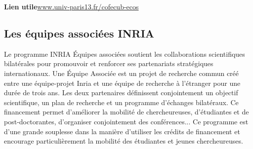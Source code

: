 \textbf{Lien utile\hspace{.5em}}\url{www.univ-paris13.fr/cofecub-ecos}


\subsection{Les \'equipes associ\'ees INRIA}
Le programme INRIA \og\'Equipes associ\'ees \fg{} soutient les collaborations scientifiques bilat\'erales pour promouvoir et renforcer ses partenariats strat\'egiques internationaux. Une \'Equipe Associ\'ee est un projet de recherche commun cr\'e\'e entre une \'equipe-projet Inria et une \'equipe de recherche à l'\'etranger pour une dur\'ee de trois ans. Les deux partenaires d\'efinissent conjointement un objectif scientifique, un plan de recherche et un programme d’\'echanges bilat\'eraux.
Ce financement permet d'am\'eliorer la mobilit\'e de chercheur\mp euse\mp s,
d'\'etudiant\mp e\mp s et de post-doctorant\mp e\mp s, d'organiser conjointement  des conf\'erences...
Ce programme est d'une grande souplesse dans la mani\`ere d'utiliser les cr\'edits de financement et
 encourage particuli\`erement la mobilit\'e des \'etudiant\mp e\mp s et jeunes chercheur\mp euse\mp s.
 

